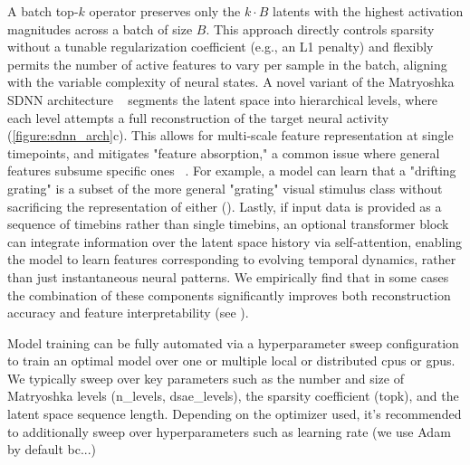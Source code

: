 A batch top-$k$ operator preserves only the $k \cdot B$ latents with the highest activation magnitudes across a batch of size $B$. This approach directly controls sparsity without a tunable regularization coefficient (e.g., an L1 penalty) and flexibly permits the number of active features to vary per sample in the batch, aligning with the variable complexity of neural states. A novel variant of the Matryoshka SDNN architecture ~\cite{bussmann_2025_msae} segments the latent space into hierarchical levels, where each level attempts a full reconstruction of the target neural activity (\autoref{figure:sdnn_arch}c). This allows for multi-scale feature representation at single timepoints, and mitigates "feature absorption," a common issue where general features subsume specific ones ~\cite{chanin_2024_feature_absorption}. For example, a model can learn that a "drifting grating" is a subset of the more general "grating" visual stimulus class without sacrificing the representation of either (). Lastly, if input data is provided as a sequence of timebins rather than single timebins, an optional transformer block can integrate information over the latent space history via self-attention, enabling the model to learn features corresponding to evolving temporal dynamics, rather than just instantaneous neural patterns. We empirically find that in some cases the combination of these components significantly improves both reconstruction accuracy and feature interpretability (see ).

Model training can be fully automated via a hyperparameter sweep configuration to train an optimal model over one or multiple local or distributed cpus or gpus. We typically sweep over key parameters such as the number and size of Matryoshka levels (n\_levels, dsae\_levels), the sparsity coefficient (topk), and the latent space sequence length. Depending on the optimizer used, it's recommended to additionally sweep over hyperparameters such as learning rate (we use Adam by default bc...)

